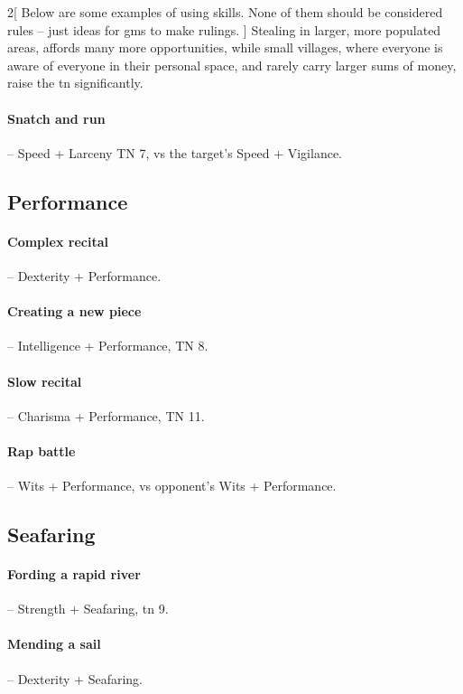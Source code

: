 \begin{multicols}{2}[
  Below are some examples of using skills.
  None of them should be considered rules -- just ideas for \glspl{gm} to make rulings.
]
Stealing in larger, more populated areas, affords many more opportunities, while small villages, where everyone is aware of everyone in their personal space, and rarely carry larger sums of money, raise the \gls{tn} significantly.

\paragraph{Snatch and run} -- Speed + Larceny TN 7, vs the target's Speed + Vigilance.

\subsection{Performance}

\paragraph{Complex recital} -- Dexterity + Performance.

\paragraph{Creating a new piece} -- Intelligence + Performance, TN 8.

\paragraph{Slow recital} -- Charisma + Performance, TN 11.

\paragraph{Rap battle} -- Wits + Performance, vs opponent's Wits + Performance.

\subsection{Seafaring}

\paragraph{Fording a rapid river} -- Strength + Seafaring, \gls{tn} 9.

\paragraph{Mending a sail} -- Dexterity + Seafaring.


\end{multicols}
